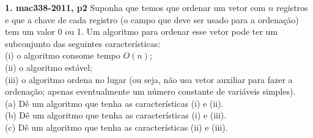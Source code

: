 
\noindent \textbf{1. mac338-2011, p2} Suponha que temos que ordenar um vetor com $n$ registros e que a chave de cada registro (o campo que deve ser usado para a ordenação) tem um valor 0 ou 1. Um algoritmo para ordenar esse vetor pode ter um subconjunto das seguintes características:\\[6pt]

\noindent (i) o algoritmo consome tempo $O(n)$;\\[2pt]
(ii) o algoritmo estável;\\[2pt]
(iii) o algoritmo ordena no lugar (ou seja, não usa vetor auxiliar para fazer a ordenação; apenas eventualmente um número constante de variáveis simples).\\[6pt]

\noindent (a) Dê um algoritmo que tenha as características (i) e (ii).\\[2pt]
(b) Dê um algoritmo que tenha as características (i) e (iii).\\[2pt]
(c) Dê um algoritmo que tenha as características (ii) e (iii).\\[12pt]